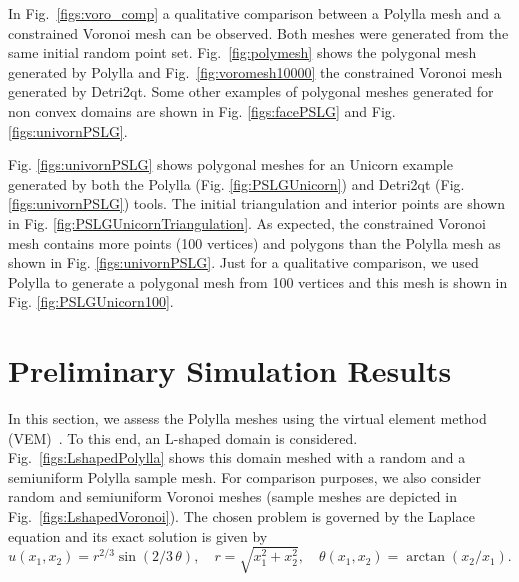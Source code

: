 \documentclass[lineno,pdflatex,sn-mathphys]{sn-jnl}%
\theoremstyle{thmstyleone}%
\theoremstyle{thmstyletwo}%
\theoremstyle{thmstylethree}%
\begin{document}
In Fig.~\ref{figs:voro_comp} a qualitative comparison between a Polylla mesh and a constrained Voronoi  mesh can be observed. Both meshes were generated from the same initial random point set. Fig.~\ref{fig:polymesh} shows the polygonal mesh generated by Polylla and Fig.~\ref{fig:voromesh10000} the constrained Voronoi mesh generated by Detri2qt. Some other examples of polygonal meshes generated for non convex domains are shown in Fig. \ref{figs:facePSLG} and Fig. \ref{figs:univornPSLG}.

 Fig. \ref{figs:univornPSLG} shows polygonal meshes for an Unicorn example generated by both  the Polylla  (Fig. \ref{fig:PSLGUnicorn}) and  Detri2qt (Fig. \ref{figs:univornPSLG}) tools. The initial triangulation and interior points are shown  in Fig. \ref{fig:PSLGUnicornTriangulation}. As expected, the  constrained Voronoi  mesh contains more points (100 vertices) and polygons than the Polylla mesh as shown in Fig. \ref{figs:univornPSLG}. Just for a qualitative comparison, we used Polylla to generate a polygonal mesh from 100 vertices and this mesh is shown in Fig. \ref{fig:PSLGUnicorn100}. 





\section{Preliminary Simulation Results}
\label{sec:simulation_results}
In this section, we assess the Polylla meshes using the virtual element method (VEM)~\cite{Basisprinciples}. To this end, an L-shaped domain is considered. Fig.~\ref{figs:LshapedPolylla} shows this domain meshed with a random and a semiuniform Polylla sample mesh. For comparison purposes, we also consider random and semiuniform Voronoi meshes (sample meshes are depicted in Fig.~\ref{figs:LshapedVoronoi}). The chosen problem is governed by the Laplace equation and its exact solution is given by~\cite{MITCHELL2013350}
\begin{equation*}
u(x_1,x_2)=r^{2/3} \sin(2/3\,\theta), \quad r=\sqrt{x_1^2+x_2^2}, \quad \theta(x_1,x_2)=\arctan(x_2/x_1).
\end{equation*}
\end{document}
